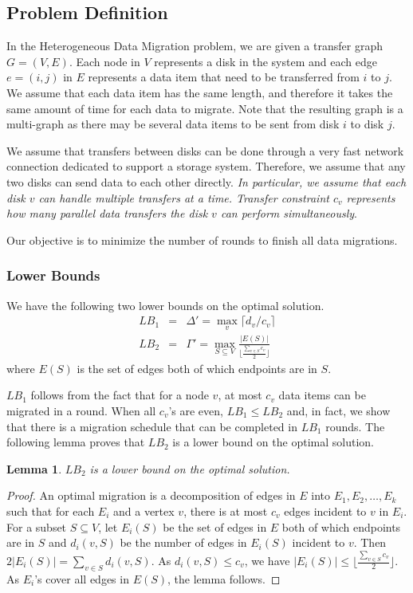 \documentclass[titlepage, 11pt]{article}
\newtheorem{lemma}[theorem]{Lemma}
\begin{document}
\subsection{Problem Definition}
In the {\sc Heterogeneous Data Migration} problem, 
we are given a transfer graph $G = (V, E)$.
Each node in $V$ represents a disk in the system
and each edge $e = (i, j)$ in $E$ represents
a data item that need to be transferred from $i$ to $j$.
We assume that each data item has the same length, and therefore
it takes the same amount of time for each data to migrate.
Note that the resulting graph is a multi-graph as
there may be several data items to be sent from disk $i$ to disk $j$.

We assume that transfers between disks can be done through 
a very fast network connection dedicated to support a storage system.
Therefore, we assume that any two disks can send data to each other directly.
{\em In particular, we assume that each disk $v$ can handle multiple transfers
at a time. Transfer constraint $c_v$ represents 
how many parallel data transfers the disk $v$ can perform
simultaneously}.

Our objective is to minimize the number of rounds
to finish all data migrations.

\subsubsection{Lower Bounds}
We have the following two lower bounds on the optimal solution.
\begin{eqnarray}
LB_1 & = & \Delta' = \max_v \lceil d_v / c_v \rceil \\
LB_2 & = & \Gamma' = \max_{S \subseteq V} \frac{|E(S)|}
{\lfloor \frac{\sum_{v \in S} c_v}{2} \rfloor}  
\end{eqnarray}
where $E(S)$ is the set of edges both of which endpoints
are in $S$.

$LB_1$ follows from the fact that for a node $v$, at most $c_v$ data items can be migrated
in a round.  When all $c_v$'s are even, $LB_1 \le LB_2$ and, 
in fact, we show that there is a migration schedule that can be
completed in $LB_1$ rounds.
The following lemma proves that $LB_2$ is a lower bound on the optimal
solution.
\begin{lemma}
$LB_2$ is a lower bound on the optimal solution.
\end{lemma}
\begin{proof}
An optimal migration is a decomposition of edges in $E$ into 
$E_1, E_2, \dots, E_k$ such that for each $E_i$ and a vertex $v$,
there is at most $c_v$ edges incident to $v$ in $E_i$.
For a subset $S \subseteq V$, let $E_i(S)$ be
the set of edges in $E$ both of which endpoints are in $S$
and $d_i(v, S)$ be the number of edges in $E_i(S)$ incident to $v$.
Then $2 |E_i(S)| =  \sum_{v \in S} d_i(v, S)$.
As $d_i(v,S) \le c_v$, we have $ |E_i(S)| \le 
\lfloor \frac{\sum_{v \in S} c_v}{2} \rfloor $.
As $E_i$'s cover all edges in $E(S)$, the lemma follows.
\end{proof}
\end{document}
